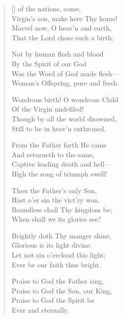 \newHymn
{}

\begin{verse}[\versewidth]
 of the nations, come,\\
Virgin's son, make here Thy home!\\
Marvel now, O heav'n and earth,\\
That the Lord chose such a birth.

Not by human flesh and blood\\
By the Spirit of our God\\
Was the Word of God made flesh---\\
Woman's Offspring, pure and fresh.

Wondrous birth! O wondrous Child\\
Of the Virgin undefiled!\\
Though by all the world disowned,\\
Still to be in heav'n enthroned.

From the Father forth He came\\
And returneth to the same,\\
Captive leading death and hell---\\
High the song of triumph swell!

Thou the Father's only Son,\\
Hast o'er sin the vict'ry won.\\
Boundless shall Thy kingdom be;\\
When shall we its glories see?

Brightly doth Thy manger shine,\\
Glorious is its light divine.\\
Let not sin o'ercloud this light;\\
Ever be our faith thus bright.

Praise to God the Father sing,\\
Praise to God the Son, our King,\\
Praise to God the Spirit be\\
Ever and eternally.

\end{verse}


